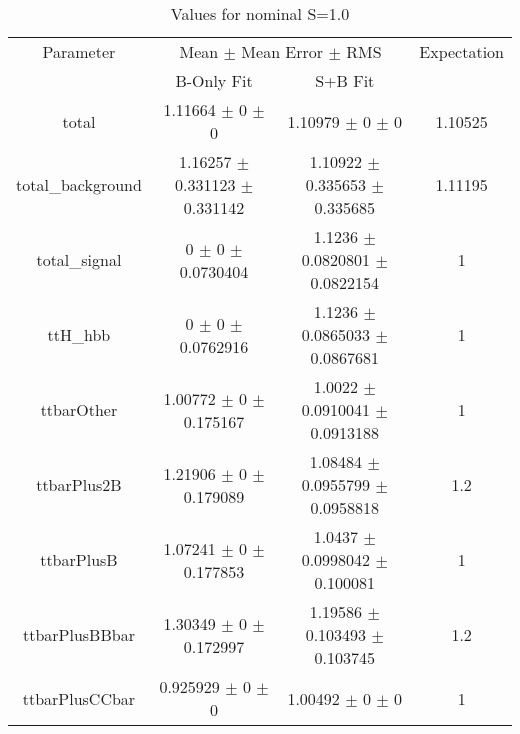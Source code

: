 \begin{table}
\centering
\caption{Values for nominal S=1.0}
\begin{tabular}{cccc}
\toprule
Parameter & \multicolumn{2}{c}{Mean $\pm$ Mean Error $\pm$ RMS} & Expectation\\
 & B-Only Fit & S+B Fit & \\
\midrule
total & \num{1.11664} $\pm$ \num{0} $\pm$ \num{0} & \num{1.10979} $\pm$ \num{0} $\pm$ \num{0} & \num{1.10525}\\
total\_background & \num{1.16257} $\pm$ \num{0.331123} $\pm$ \num{0.331142} & \num{1.10922} $\pm$ \num{0.335653} $\pm$ \num{0.335685} & \num{1.11195}\\
total\_signal & \num{0} $\pm$ \num{0} $\pm$ \num{0.0730404} & \num{1.1236} $\pm$ \num{0.0820801} $\pm$ \num{0.0822154} & \num{1}\\
ttH\_hbb & \num{0} $\pm$ \num{0} $\pm$ \num{0.0762916} & \num{1.1236} $\pm$ \num{0.0865033} $\pm$ \num{0.0867681} & \num{1}\\
ttbarOther & \num{1.00772} $\pm$ \num{0} $\pm$ \num{0.175167} & \num{1.0022} $\pm$ \num{0.0910041} $\pm$ \num{0.0913188} & \num{1}\\
ttbarPlus2B & \num{1.21906} $\pm$ \num{0} $\pm$ \num{0.179089} & \num{1.08484} $\pm$ \num{0.0955799} $\pm$ \num{0.0958818} & \num{1.2}\\
ttbarPlusB & \num{1.07241} $\pm$ \num{0} $\pm$ \num{0.177853} & \num{1.0437} $\pm$ \num{0.0998042} $\pm$ \num{0.100081} & \num{1}\\
ttbarPlusBBbar & \num{1.30349} $\pm$ \num{0} $\pm$ \num{0.172997} & \num{1.19586} $\pm$ \num{0.103493} $\pm$ \num{0.103745} & \num{1.2}\\
ttbarPlusCCbar & \num{0.925929} $\pm$ \num{0} $\pm$ \num{0} & \num{1.00492} $\pm$ \num{0} $\pm$ \num{0} & \num{1}\\
\bottomrule
\end{tabular}
\end{table}